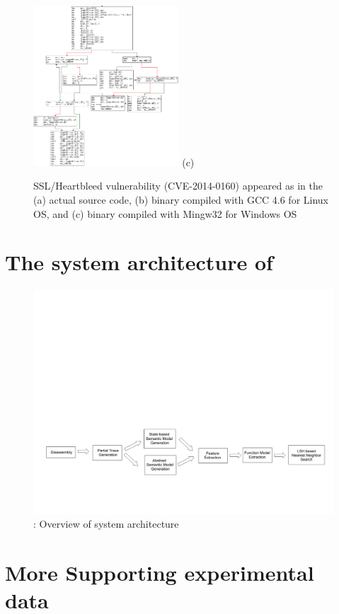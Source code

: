 \begin{appendices}
\begin{figure}[ht]
\begin{minipage}{.3\textwidth}
   \centering
  \includegraphics[height=6cm]{srj-figures/srj-mingw32.png}
     (c)
   \end{minipage}
  \caption{SSL/Heartbleed vulnerability (CVE-2014-0160) appeared as in the (a) actual source code, (b) binary compiled with GCC 4.6 for Linux OS, and (c) binary compiled with Mingw32 for Windows OS} \label{fig:prob_stat}
\end{figure}

 \section{The system architecture of \tool}
\begin{figure}[!ht]
	\centering
    \includegraphics[width=1.0\textwidth]{srj-figures/srj-archi.pdf} %
	\caption{\tool: Overview of system architecture}\label{fig:sys_arch}
\end{figure}

\newpage
 \section{More Supporting experimental data} \label{app: exp_data2}


\end{appendices}

